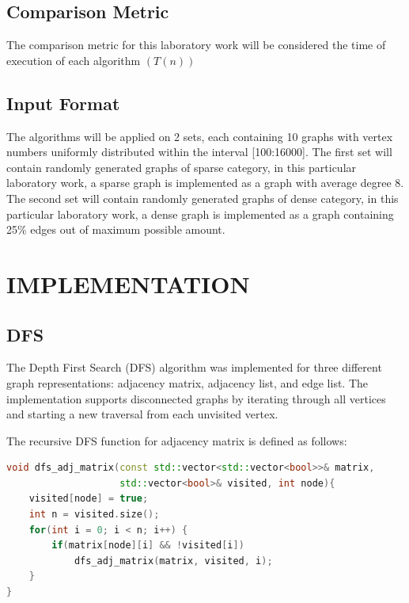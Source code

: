 \documentclass[12pt, a4paper]{report}
\begin{document}
\section{Comparison Metric}

The comparison metric for this laboratory work will be considered the time of execution of each 
algorithm $(T(n))$

\section{Input Format}

The algorithms will be applied on 2 sets, each containing 10 graphs with vertex numbers uniformly distributed within the interval [100:16000].
The first set will contain randomly generated graphs of sparse category, in this particular laboratory work, a sparse graph is implemented as a graph with average degree 8.
The second set will contain randomly generated graphs of dense category, in this particular laboratory work, a dense graph is implemented as a graph containing 25\% edges out of maximum possible amount.

\chapter{IMPLEMENTATION}

\section{DFS}

The Depth First Search (DFS) algorithm was implemented for three different graph representations: adjacency matrix, adjacency list, and edge list. The implementation supports disconnected graphs by iterating through all vertices and starting a new traversal from each unvisited vertex.

The recursive DFS function for adjacency matrix is defined as follows:

\begin{lstlisting}[language=C++, caption={DFS for adjacency matrix (recursive helper)}]
void dfs_adj_matrix(const std::vector<std::vector<bool>>& matrix, 
                    std::vector<bool>& visited, int node){
    visited[node] = true;
    int n = visited.size();
    for(int i = 0; i < n; i++) {
        if(matrix[node][i] && !visited[i]) 
            dfs_adj_matrix(matrix, visited, i);
    }
}
\end{lstlisting}
\end{document}
